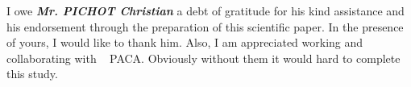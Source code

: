 
\begin{acknowledgements}      


	I owe \textbf{\textit{Mr. PICHOT Christian}} a debt of gratitude for his kind assistance and his endorsement through the preparation of this scientific paper. In the presence of yours, I would like to thank him. Also, I am appreciated working and collaborating with  ~\cite{inra-paca:2019} PACA. Obviously without them it would hard to complete this study.


\end{acknowledgements}
